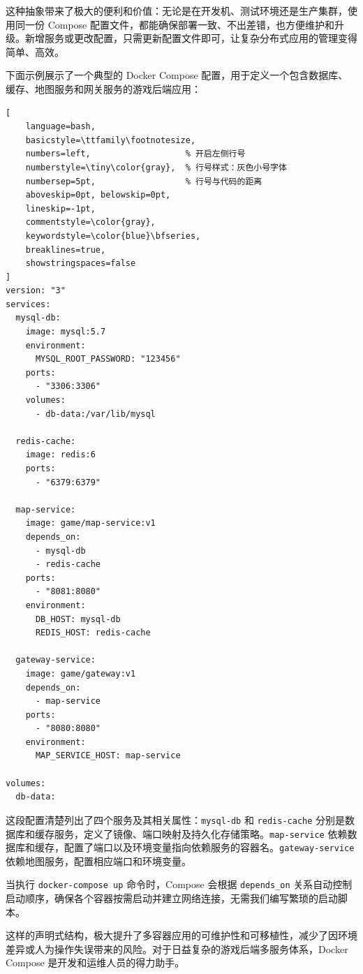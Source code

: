 这种抽象带来了极大的便利和价值：无论是在开发机、测试环境还是生产集群，使用同一份 Compose 配置文件，都能确保部署一致、不出差错，也方便维护和升级。新增服务或更改配置，只需更新配置文件即可，让复杂分布式应用的管理变得简单、高效。

下面示例展示了一个典型的 Docker Compose 配置，用于定义一个包含数据库、缓存、地图服务和网关服务的游戏后端应用：

\begin{tcolorbox}[title=Docker Compose 配置示例]
\begin{lstlisting}[
    language=bash,
    basicstyle=\ttfamily\footnotesize,
    numbers=left,                   % 开启左侧行号
    numberstyle=\tiny\color{gray},  % 行号样式：灰色小号字体
    numbersep=5pt,                  % 行号与代码的距离
    aboveskip=0pt, belowskip=0pt,
    lineskip=-1pt,
    commentstyle=\color{gray},
    keywordstyle=\color{blue}\bfseries,
    breaklines=true,
    showstringspaces=false
]
version: "3"
services:
  mysql-db:
    image: mysql:5.7
    environment:
      MYSQL_ROOT_PASSWORD: "123456"
    ports:
      - "3306:3306"
    volumes:
      - db-data:/var/lib/mysql

  redis-cache:
    image: redis:6
    ports:
      - "6379:6379"

  map-service:
    image: game/map-service:v1
    depends_on:
      - mysql-db
      - redis-cache
    ports:
      - "8081:8080"
    environment:
      DB_HOST: mysql-db
      REDIS_HOST: redis-cache

  gateway-service:
    image: game/gateway:v1
    depends_on:
      - map-service
    ports:
      - "8080:8080"
    environment:
      MAP_SERVICE_HOST: map-service

volumes:
  db-data:
\end{lstlisting}
\end{tcolorbox}

这段配置清楚列出了四个服务及其相关属性：\texttt{mysql-db} 和 \texttt{redis-cache} 分别是数据库和缓存服务，定义了镜像、端口映射及持久化存储策略。\texttt{map-service} 依赖数据库和缓存，配置了端口以及环境变量指向依赖服务的容器名。\texttt{gateway-service} 依赖地图服务，配置相应端口和环境变量。

当执行 \texttt{docker-compose up} 命令时，Compose 会根据 \texttt{depends\_on} 关系自动控制启动顺序，确保各个容器按需启动并建立网络连接，无需我们编写繁琐的启动脚本。

这样的声明式结构，极大提升了多容器应用的可维护性和可移植性，减少了因环境差异或人为操作失误带来的风险。对于日益复杂的游戏后端多服务体系，Docker Compose 是开发和运维人员的得力助手。

